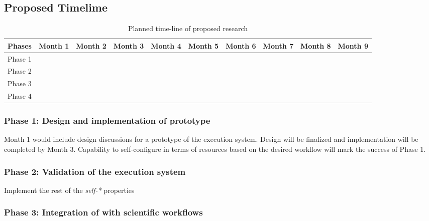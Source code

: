 \subsection{Proposed Timelime}
\begin{table*}
	\centering
	\begin{tabular}{ |p{1.25cm}|p{1.25cm} p{1.25cm} p{1.25cm} p{1.25cm} p{1.25cm} p{1.25cm} p{1.25cm} p{1.25cm} p{1.25cm}|}
		\hline
		Phases  & Month 1 & Month 2 & Month 3 & Month 4 & Month 5 & Month 6 & Month 7 & Month 8 & Month 9 \\\hline\hline
		Phase 1 &         &         &         &         &         &         &         &         &         \\\hline
		Phase 2 &         &         &         &         &         &         &         &         &         \\\hline
		Phase 3 &         &         &         &         &         &         &         &         &         \\\hline
		Phase 4 &         &         &         &         &         &         &         &         &         \\\hline
	\end{tabular}
\caption{Planned time-line of proposed research}\label{tab:work_plan}
\end{table*}

\subsubsection{Phase 1: Design and implementation of prototype}

Month 1 would include design discussions for a prototype of the execution system. Design will be finalized and implementation will be completed by Month 3. Capability to self-configure in terms of resources based on the desired workflow will mark the success of Phase 1.

\subsubsection{Phase 2: Validation of the execution system}

Implement the rest of the \textit{self-*} properties

\subsubsection{Phase 3: Integration of with scientific workflows}


